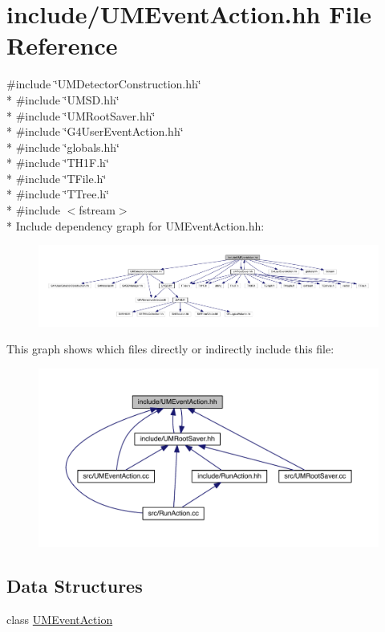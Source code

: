\hypertarget{UMEventAction_8hh}{}\section{include/\+U\+M\+Event\+Action.hh File Reference}
\label{UMEventAction_8hh}
{\ttfamily \#include \char`\"{}U\+M\+Detector\+Construction.\+hh\char`\"{}}\\*
{\ttfamily \#include \char`\"{}U\+M\+S\+D.\+hh\char`\"{}}\\*
{\ttfamily \#include \char`\"{}U\+M\+Root\+Saver.\+hh\char`\"{}}\\*
{\ttfamily \#include \char`\"{}G4\+User\+Event\+Action.\+hh\char`\"{}}\\*
{\ttfamily \#include \char`\"{}globals.\+hh\char`\"{}}\\*
{\ttfamily \#include \char`\"{}T\+H1\+F.\+h\char`\"{}}\\*
{\ttfamily \#include \char`\"{}T\+File.\+h\char`\"{}}\\*
{\ttfamily \#include \char`\"{}T\+Tree.\+h\char`\"{}}\\*
{\ttfamily \#include $<$fstream$>$}\\*
Include dependency graph for U\+M\+Event\+Action.\+hh\+:
\nopagebreak
\begin{figure}[H]
\begin{center}
\leavevmode
\includegraphics[width=350pt]{UMEventAction_8hh__incl}
\end{center}
\end{figure}
This graph shows which files directly or indirectly include this file\+:
\nopagebreak
\begin{figure}[H]
\begin{center}
\leavevmode
\includegraphics[width=350pt]{UMEventAction_8hh__dep__incl}
\end{center}
\end{figure}
\subsection*{Data Structures}
\begin{DoxyCompactItemize}
\item 
class \hyperlink{classUMEventAction}{U\+M\+Event\+Action}
\end{DoxyCompactItemize}
